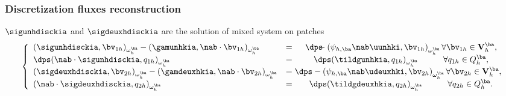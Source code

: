 \documentclass{beamer}
\renewcommand{\div}{\mathrm{div}}
\begin{document}
\begin{frame}
\frametitle{Discretization fluxes reconstruction}
$\sigunhdisckia$ and $\sigdeuxhdisckia$ are the solution of mixed system on patches
\begin{equation*}
\left\lbrace\begin{array}{llccc}
(\sigunhdisckia,{\bv}_{1h})_{\omega_{h}^{\ba}}-(\gamunhkia,\nab \cdot {\bv}_{1h})_{\omega_{h}^{\ba}} &=& \dps \hspace{-0.25 cm}-\left(\psi_{h,\ba} \nab \uunhki,{\bv}_{1h}\right)_{\omega_h^{\ba}}   \forall {\bv}_{1h}\in {\bf V}_{h}^{\ba}, \\
\dps(\nab \cdot \sigunhdisckia,q_{1h})_{\omega_{h}^{\ba}}&=&  \dps(\tildgunhkia,q_{1h})_{\omega_{h}^{\ba}} \quad \qquad \forall q_{1h}\in Q_{h}^{\ba},\\
(\sigdeuxhdisckia,{\bv}_{2h})_{\omega_{h}^{\ba}}-(\gamdeuxhkia,\nab \cdot {\bv}_{2h})_{\omega_{h}^{\ba}} &=& \hspace{-0.25 cm}\dps-\left(\psi_{h,\ba} \nab \udeuxhki,{\bv}_{2h}\right)_{\omega_h^{\ba}}  \forall {\bv}_{2h}\in {\bf V}_{h}^{\ba},\\
(\nab \cdot \sigdeuxhdisckia,q_{2h})_{\omega_{h}^{\ba}}&=&\dps(\tildgdeuxhkia,q_{2h})_{\omega_{h}^{\ba}}  \quad \qquad\forall q_{2h} \in Q_{h}^{\ba}.
\end{array}
\right.
\end{equation*}
\hspace{1.2 cm}
\end{frame}
\end{document}
